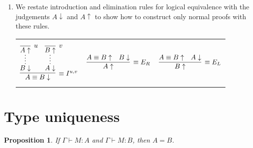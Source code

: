 \documentclass[11pt,letterpaper]{article}
\newtheorem{proposition}{Proposition}
\newcommand{\proves}{\vdash}
\newcommand{\neut}{\uparrow}
\newcommand{\norm}{\downarrow}
\begin{document}
\begin{enumerate}
\begin{proof}
\begin{description}
                    This proof is essentially the same as for $\equiv E_L$ so
                    we will omit it.
            \end{description}
        \end{proof}

    \item
        We restate introduction and elimination rules for logical equivalence
        with the judgements $A\norm$ and $A\neut$ to show how to construct only
        normal proofs with these rules.

        \begin{center}
            \begin{tabular}{c c c}
                $$
                \infer[\equiv I^{u,v}]{A \equiv B \norm}{
                    \infer*{B \norm}{
                        \infer[u]{A \neut}{}
                    }
                    &
                    \infer*{A \norm}{
                        \infer[v]{B \neut}{}
                    }
                }
                $$
                &
                $$
                \infer[\equiv E_R]{A \neut}{
                    A \equiv B \neut
                    &
                    B \norm
                }
                $$
                &
                $$
                \infer[\equiv E_L]{B \neut}{
                    A \equiv B \neut
                    &
                    A \norm
                }
                $$
            \end{tabular}
        \end{center}

\end{enumerate}

\section{Type uniqueness}

\begin{proposition}
    If $\Gamma \proves M : A$ and $\Gamma \proves M : B$, then $A = B$.
\end{proposition}
\end{document}
